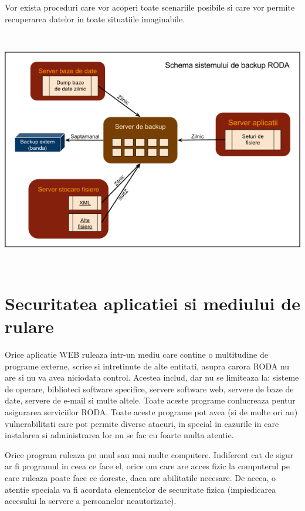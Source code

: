 Vor exista proceduri care vor acoperi toate scenariile posibile si care vor permite recuperarea datelor in toate
situatiile imaginabile.

 \includegraphics[width=6.2709in,height=4.1354in]{SecuritateaarhiveiRODA-img001.png} 


\section{Securitatea aplicatiei si mediului de rulare}

Orice aplicatie WEB ruleaza intr-un mediu care contine o multitudine de programe externe, scrise si intretinute de alte
entitati, asupra carora RODA nu are si nu va avea niciodata control. Acestea includ, dar nu se limiteaza la: sisteme de
operare, biblioteci software specifice, servere software web, servere de baze de date, servere de e-mail si multe
altele. Toate aceste programe conlucreaza pentur asigurarea serviciilor RODA. Toate aceste programe pot avea (si de
multe ori au) vulnerabilitati care pot permite diverse atacuri, in special in cazurile in care instalarea si
administrarea lor nu se fac cu foarte multa atentie.

Orice program ruleaza pe unul sau mai multe computere. Indiferent cat de sigur ar fi programul in ceea ce face el, orice
om care are acces fizic la computerul pe care ruleaza poate face ce doreste, daca are abilitatile necesare. De aceea, o
atentie speciala va fi acordata elementelor de securitate fizica (impiedicarea accesului la servere a persoanelor
neautorizate).

